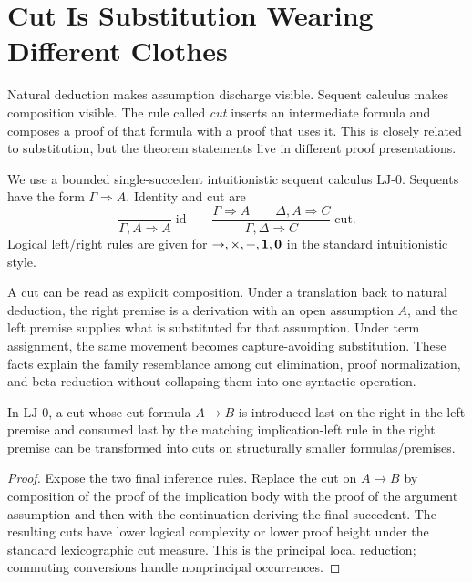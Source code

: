 \chapter{Cut Is Substitution Wearing Different Clothes}
\label{ch:cut}

Natural deduction makes assumption discharge visible. Sequent calculus makes composition visible. The rule called \emph{cut} inserts an intermediate formula and composes a proof of that formula with a proof that uses it. This is closely related to substitution, but the theorem statements live in different proof presentations.

We use a bounded single-succedent intuitionistic sequent calculus $\mathrm{LJ}\text{-}0$. Sequents have the form $\Gamma\Rightarrow A$. Identity and cut are
\[
\frac{}{\Gamma,A\Rightarrow A}\;\mathrm{id}
\qquad
\frac{\Gamma\Rightarrow A\qquad \Delta,A\Rightarrow C}{\Gamma,\Delta\Rightarrow C}\;\mathrm{cut}.
\]
Logical left/right rules are given for $\to,\times,+,\mathbf{1},\mathbf{0}$ in the standard intuitionistic style.



A cut can be read as explicit composition. Under a translation back to natural deduction, the right premise is a derivation with an open assumption $A$, and the left premise supplies what is substituted for that assumption. Under term assignment, the same movement becomes capture-avoiding substitution. These facts explain the family resemblance among cut elimination, proof normalization, and beta reduction without collapsing them into one syntactic operation.

\begin{proposition}
In $\mathrm{LJ}\text{-}0$, a cut whose cut formula $A\to B$ is introduced last on the right in the left premise and consumed last by the matching implication-left rule in the right premise can be transformed into cuts on structurally smaller formulas/premises.
\end{proposition}
\begin{proof}
Expose the two final inference rules. Replace the cut on $A\to B$ by composition of the proof of the implication body with the proof of the argument assumption and then with the continuation deriving the final succedent. The resulting cuts have lower logical complexity or lower proof height under the standard lexicographic cut measure. This is the principal local reduction; commuting conversions handle nonprincipal occurrences.
\end{proof}

